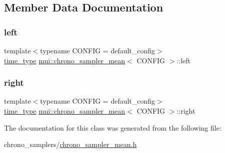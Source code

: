 \subsection{Member Data Documentation}
\mbox{\label{classmui_1_1chrono__sampler__mean_a39d914bda15d16d29a66de7711dcafd2}} 
\subsubsection{\texorpdfstring{left}{left}}
{\footnotesize\ttfamily template$<$typename C\+O\+N\+F\+IG  = default\+\_\+config$>$ \\
\hyperlink{classmui_1_1chrono__sampler__mean_aa818a9c8850aa9fda611430c158a0072}{time\+\_\+type} \hyperlink{classmui_1_1chrono__sampler__mean}{mui\+::chrono\+\_\+sampler\+\_\+mean}$<$ C\+O\+N\+F\+IG $>$\+::left\hspace{0.3cm}{\ttfamily [protected]}}

\mbox{\label{classmui_1_1chrono__sampler__mean_a21a36a568b9c621ff7e024a019822531}} 
\subsubsection{\texorpdfstring{right}{right}}
{\footnotesize\ttfamily template$<$typename C\+O\+N\+F\+IG  = default\+\_\+config$>$ \\
\hyperlink{classmui_1_1chrono__sampler__mean_aa818a9c8850aa9fda611430c158a0072}{time\+\_\+type} \hyperlink{classmui_1_1chrono__sampler__mean}{mui\+::chrono\+\_\+sampler\+\_\+mean}$<$ C\+O\+N\+F\+IG $>$\+::right\hspace{0.3cm}{\ttfamily [protected]}}



The documentation for this class was generated from the following file\+:\begin{DoxyCompactItemize}
\item 
chrono\+\_\+samplers/\hyperlink{chrono__sampler__mean_8h}{chrono\+\_\+sampler\+\_\+mean.\+h}\end{DoxyCompactItemize}
